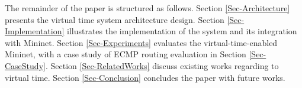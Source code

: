 The remainder of the paper is structured as follows. Section \ref{Sec-Architecture} presents the virtual time system architecture design. 
Section \ref{Sec-Implementation} illustrates the implementation of the system and its integration with Mininet. Section \ref{Sec-Experiments} evaluates the virtual-time-enabled Mininet, with a case study of ECMP routing evaluation in Section \ref{Sec-CaseStudy}. 
Section \ref{Sec-RelatedWorks} discuss existing works regarding to virtual time. Section \ref{Sec-Conclusion} concludes the paper with future works.



